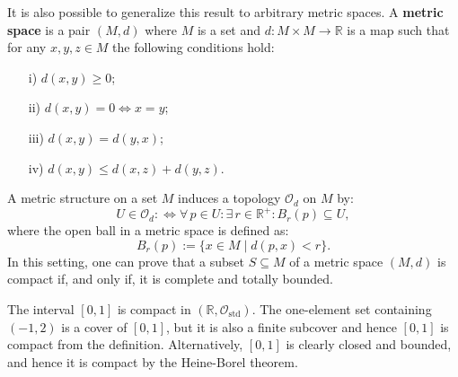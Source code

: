 \documentclass[root.tex]{subfiles}
\begin{document}
\begin{remark}
It is also possible to generalize this result to arbitrary metric spaces. A \textbf{metric space} is a pair $(M,d)$ where $M$ is a set and $d: M\times M \to \mathbb{R}$ is a map such that for any $x,y,z \in M$ the following conditions hold:
\begin{enumerate}
\item[i)] $d(x,y) \geq 0$;
\item[ii)] $d(x,y) = 0 \Leftrightarrow x = y$;
\item[iii)] $d(x,y) = d(y,x) $;
\item[iv)] $d(x,y)\leq d(x,z)+d(y,z)$.
\end{enumerate}
A metric structure on a set $M$ induces a topology $\mathcal{O}_d$ on $M$ by:
$$
U \in \mathcal{O}_d :\Leftrightarrow \forall \, p \in U : \exists \, r \in \mathbb{R}^+ : B_r(p) \subseteq U,
$$
where the open ball in a metric space is defined as:
$$
B_r(p) := \{x \in M \mid d(p,x) < r\}.
$$
In this setting, one can prove that a subset $S\subseteq M$ of a metric space $(M,d)$ is compact if, and only if, it is complete and totally bounded.
\end{remark}

\begin{myex}
The interval $[0,1]$ is compact in $(\mathbb{R},\mathcal{O}_\mathrm{std})$. The one-element set containing $(-1,2)$ is a cover of $[0,1]$, but it is also a finite subcover and hence $[0,1]$ is compact from the definition. Alternatively, $[0,1]$ is clearly closed and bounded, and hence it is compact by the Heine-Borel theorem.
\end{myex}
\end{document}
